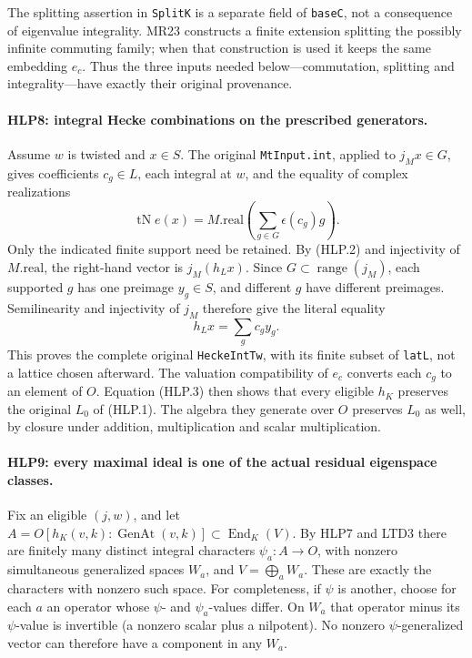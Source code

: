 The splitting assertion in \texttt{SplitK} is a separate field of
\texttt{baseC}, not a consequence of eigenvalue integrality. MR23
constructs a finite extension splitting the possibly infinite
commuting family; when that construction is used it keeps the same
embedding \(e_c\). Thus the three inputs needed below---commutation,
splitting and integrality---have exactly their original provenance.

\paragraph{HLP8: integral Hecke combinations on the prescribed generators.}
\label{claim:HLP8}
Assume \(w\) is twisted and \(x\in S\). The original
\texttt{MtInput.int}, applied to \(j_Mx\in G\), gives coefficients
\(c_g\in L\), each integral at \(w\), and the equality of complex
realizations
\[
 \operatorname{tN}e(x)
   =M.\mathrm{real}\!\left(\sum_{g\in G}\epsilon(c_g)g\right).
                                                               \tag{HLP.6}
\]
Only the indicated finite support need be retained. By (HLP.2) and
injectivity of \(M.\mathrm{real}\), the right-hand vector is
\(j_M(h_Lx)\). Since \(G\subset\operatorname{range}(j_M)\), each
supported \(g\) has one preimage \(y_g\in S\), and different \(g\)
have different preimages. Semilinearity and injectivity of \(j_M\)
therefore give the literal equality
\[
                 h_Lx=\sum_g c_g y_g.                \tag{HLP.7}
\]
This proves the complete original \texttt{HeckeIntTw}, with its
finite subset of \texttt{latL}, not a lattice chosen afterward.
The valuation compatibility of \(e_c\) converts each \(c_g\) to
an element of \(O\). Equation (HLP.3) then shows that every eligible
\(h_K\) preserves the original \(L_0\) of (HLP.1). The algebra they
generate over \(O\) preserves \(L_0\) as well, by closure under
addition, multiplication and scalar multiplication.

\paragraph{HLP9: every maximal ideal is one of the actual residual eigenspace classes.}
\label{claim:HLP9}
Fix an eligible \((j,w)\), and let
\(A=O[h_K(v,k):\operatorname{GenAt}(v,k)]\subset\operatorname{End}_K(V)\).
By HLP7 and LTD3 there are finitely many distinct integral characters
\(\psi_a:A\to O\), with nonzero simultaneous generalized spaces
\(W_a\), and \(V=\bigoplus_a W_a\). These are exactly the characters
with nonzero such space. For completeness, if \(\psi\) is another,
choose for each \(a\) an operator whose \(\psi\)- and
\(\psi_a\)-values differ. On \(W_a\) that operator minus its
\(\psi\)-value is invertible (a nonzero scalar plus a nilpotent).
No nonzero \(\psi\)-generalized vector can therefore have a
component in any \(W_a\).


